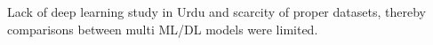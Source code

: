 Lack of deep learning study in Urdu and scarcity of proper datasets, thereby comparisons between multi ML/DL models were limited.